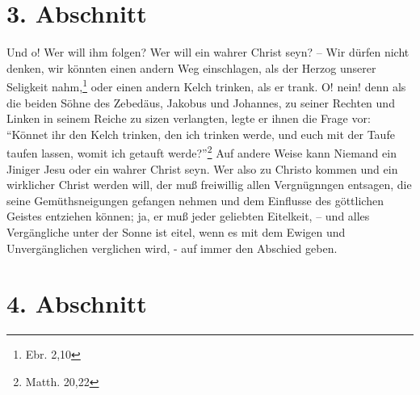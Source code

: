 \section{3. Abschnitt} \label{kap16_ab3}

Und o! Wer will ihm folgen? Wer will ein wahrer Christ seyn? -- Wir dürfen nicht
denken, wir könnten einen andern Weg einschlagen, als der Herzog unserer
Seligkeit nahm,\footnote{Ebr. 2,10} oder einen andern Kelch trinken, als er
trank. O! nein! denn als die beiden Söhne des Zebedäus, Jakobus und Johannes, zu
seiner Rechten und Linken in seinem Reiche zu sizen verlangten, legte er ihnen
die Frage vor: "`Könnet ihr den Kelch trinken, den ich trinken werde, und euch
mit der Taufe taufen lassen, womit ich getauft werde?"'\footnote{Matth. 20,22}
Auf andere Weise kann Niemand ein Jiniger Jesu oder ein wahrer Christ seyn. Wer
also zu Christo kommen und ein wirklicher Christ werden will, der muß freiwillig
allen Vergnügnngen entsagen, die seine Gemüthsneigungen gefangen nehmen und dem
Einflusse des göttlichen Geistes entziehen können; ja, er muß jeder geliebten
Eitelkeit, – und alles Vergängliche unter der Sonne ist eitel, wenn es mit dem
Ewigen und Unvergänglichen verglichen wird, - auf immer den Abschied geben.

\section{4. Abschnitt} \label{kap16_ab4}

